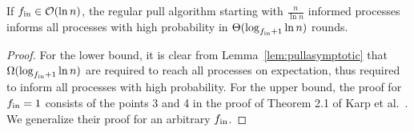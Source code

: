  
\begin{lemma}
    \label{lem:loglog}
        If $f_\text{in}\in\mathcal{O}(\ln n)$, the regular pull algorithm starting with $\frac{n}{\ln n}$ informed processes informs all processes with high probability in $\Theta(\log_{f_\text{in}+1} \ln n)$ rounds.
  \end{lemma}

  \begin{proof}
For the lower bound, it is clear from Lemma~\ref{lem:pullasymptotic} that $\Omega(\log_{f_\text{in}+1} \ln n)$ are required to reach all processes on expectation, thus required to inform all processes with high probability. For the upper bound, the proof for $f_\text{in}=1$ consists of the points 3 and 4 in the proof of Theorem 2.1 of Karp et
    al.~\cite{DBLP:conf/focs/KarpSSV00}. We generalize their proof for an arbitrary $f_\text{in}$.


\end{proof}
